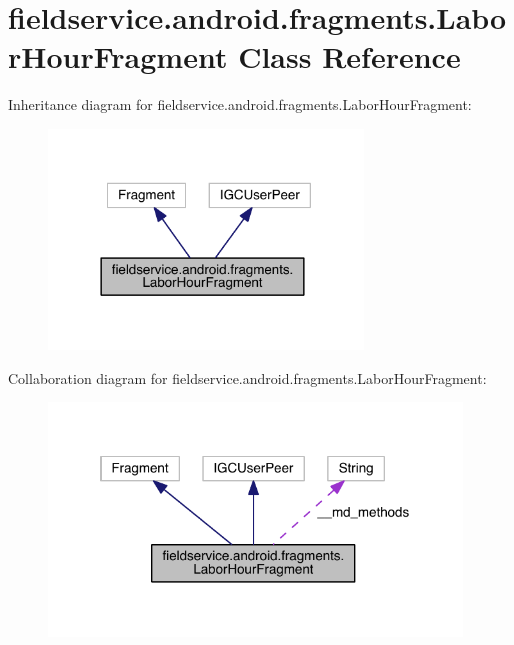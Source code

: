 \hypertarget{classfieldservice_1_1android_1_1fragments_1_1_labor_hour_fragment}{\section{fieldservice.\+android.\+fragments.\+Labor\+Hour\+Fragment Class Reference}
\label{classfieldservice_1_1android_1_1fragments_1_1_labor_hour_fragment}
}


Inheritance diagram for fieldservice.\+android.\+fragments.\+Labor\+Hour\+Fragment\+:
\nopagebreak
\begin{figure}[H]
\begin{center}
\leavevmode
\includegraphics[width=237pt]{classfieldservice_1_1android_1_1fragments_1_1_labor_hour_fragment__inherit__graph}
\end{center}
\end{figure}


Collaboration diagram for fieldservice.\+android.\+fragments.\+Labor\+Hour\+Fragment\+:
\nopagebreak
\begin{figure}[H]
\begin{center}
\leavevmode
\includegraphics[width=311pt]{classfieldservice_1_1android_1_1fragments_1_1_labor_hour_fragment__coll__graph}
\end{center}
\end{figure}
